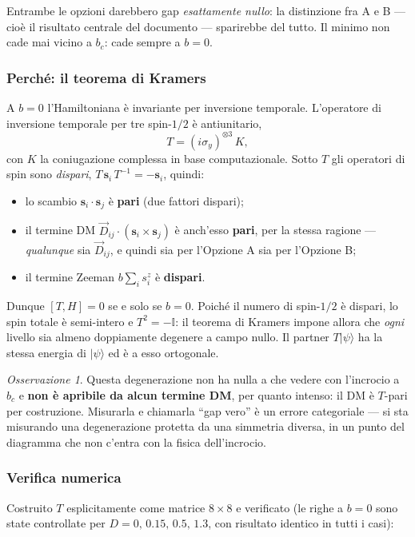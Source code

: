 \documentclass[11pt,a4paper]{article}
\theoremstyle{remark}
\newtheorem*{osservazionekramers}{Osservazione}
\newcommand{\ket}[1]{\lvert #1\rangle}
\begin{document}
\noindent
Entrambe le opzioni darebbero gap \emph{esattamente nullo}: la distinzione fra A e
B — cioè il risultato centrale del documento — sparirebbe del tutto. Il minimo
non cade mai vicino a $b_c$: cade sempre a $b=0$.

\subsubsection*{Perché: il teorema di Kramers}

A $b=0$ l'Hamiltoniana è invariante per inversione temporale. L'operatore di
inversione temporale per tre spin-$1/2$ è antiunitario,
\[
T = (i\sigma_y)^{\otimes 3}\,K,
\]
con $K$ la coniugazione complessa in base computazionale. Sotto $T$ gli operatori
di spin sono \emph{dispari}, $T\,\mathbf s_i\,T^{-1}=-\mathbf s_i$, quindi:
\begin{itemize}[leftmargin=1.4em]
\item lo scambio $\mathbf s_i\!\cdot\!\mathbf s_j$ è \textbf{pari} (due fattori
dispari);
\item il termine DM $\vec D_{ij}\!\cdot\!(\mathbf s_i\times\mathbf s_j)$ è
anch'esso \textbf{pari}, per la stessa ragione — \emph{qualunque} sia
$\vec D_{ij}$, e quindi sia per l'Opzione A sia per l'Opzione B;
\item il termine Zeeman $b\sum_i s_i^z$ è \textbf{dispari}.
\end{itemize}
Dunque $[T,H]=0$ se e solo se $b=0$. Poiché il numero di spin-$1/2$ è dispari, lo
spin totale è semi-intero e $T^2=-\mathbb{I}$: il teorema di Kramers impone allora
che \emph{ogni} livello sia almeno doppiamente degenere a campo nullo. Il partner
$T\ket\psi$ ha la stessa energia di $\ket\psi$ ed è a esso ortogonale.

\begin{osservazionekramers}
Questa degenerazione non ha nulla a che vedere con l'incrocio a $b_c$ e
\textbf{non è apribile da alcun termine DM}, per quanto intenso: il DM è $T$-pari
per costruzione. Misurarla e chiamarla ``gap vero'' è un errore categoriale — si
sta misurando una degenerazione protetta da una simmetria diversa, in un punto
del diagramma che non c'entra con la fisica dell'incrocio.
\end{osservazionekramers}

\subsubsection*{Verifica numerica}

Costruito $T$ esplicitamente come matrice $8\times8$ e verificato (le righe a
$b=0$ sono state controllate per $D=0,\,0.15,\,0.5,\,1.3$, con risultato
identico in tutti i casi):
\end{document}
